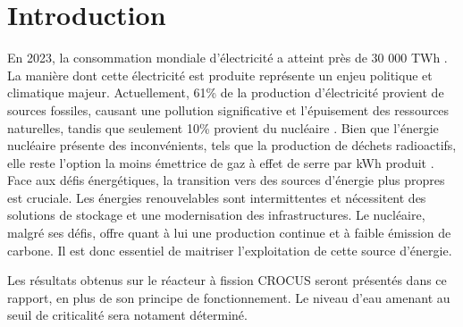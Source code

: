 \section{Introduction}

En 2023, la consommation mondiale d'électricité a atteint près de 30 000 TWh \cite{owid-energy}. La manière dont cette électricité est produite représente un enjeu politique et climatique majeur. Actuellement, 61\% de la production d'électricité provient de sources fossiles, causant une pollution significative et l'épuisement des ressources naturelles, tandis que seulement 10\% provient du nucléaire \cite{owid-electricity-mix}. Bien que l'énergie nucléaire présente des inconvénients, tels que la production de déchets radioactifs, elle reste l'option la moins émettrice de gaz à effet de serre par kWh produit \cite{owid-nuclear-energy}.
Face aux défis énergétiques, la transition vers des sources d'énergie plus propres est cruciale. Les énergies renouvelables sont intermittentes et nécessitent des solutions de stockage et une modernisation des infrastructures. Le nucléaire, malgré ses défis, offre quant à lui une production continue et à faible émission de carbone. Il est donc essentiel de maitriser l'exploitation de cette source d'énergie.

Les résultats obtenus sur le réacteur à fission CROCUS seront présentés dans ce rapport, en plus de son principe de fonctionnement. Le niveau d'eau amenant au seuil de criticalité sera notament déterminé.